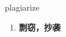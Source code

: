 
\begin{frame}
{\huge plagiarize}
\begin{center}
\begin{enumerate}\Large
  \item \textbf{剽窃，抄袭}
\end{enumerate}
\end{center}
\end{frame}
